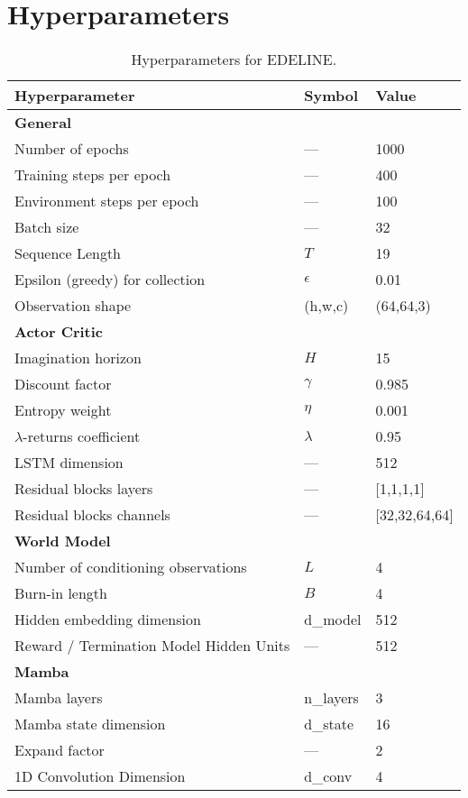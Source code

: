 \section{Hyperparameters}
\label{appendix:hyper}

\begin{table}[h]
\caption{Hyperparameters for EDELINE.}
\label{tab:hyperparameters}
\centering
\small
\begin{tabular}{lll}
\toprule
Hyperparameter & Symbol & Value \\
\midrule
\multicolumn{3}{l}{\textbf{General}} \\
Number of epochs & --- & 1000 \\
Training steps per epoch & --- & 400 \\
Environment steps per epoch & --- & 100 \\
Batch size & --- & 32 \\
Sequence Length & $T$ & 19 \\
Epsilon (greedy) for collection & $\epsilon$ & 0.01 \\
Observation shape & (h,w,c) & (64,64,3) \\
\midrule
\multicolumn{3}{l}{\textbf{Actor Critic}} \\
Imagination horizon & $H$ & 15 \\
Discount factor & $\gamma$ & 0.985 \\
Entropy weight & $\eta$ & 0.001 \\
$\lambda$-returns coefficient & $\lambda$ & 0.95 \\
LSTM dimension & --- & 512 \\
Residual blocks layers & --- & [1,1,1,1] \\
Residual blocks channels & --- & [32,32,64,64] \\
\midrule
\multicolumn{3}{l}{\textbf{World Model}} \\
Number of conditioning observations & $L$ & 4 \\
Burn-in length & $B$ & 4 \\
Hidden embedding dimension & d\_model & 512 \\
Reward / Termination Model Hidden Units & --- & 512 \\
\midrule
\multicolumn{3}{l}{\textbf{Mamba}} \\
Mamba layers & n\_layers & 3 \\
Mamba state dimension & d\_state & 16 \\
Expand factor & --- & 2 \\
1D Convolution Dimension & d\_conv & 4 \\

\end{tabular}
\end{table}
